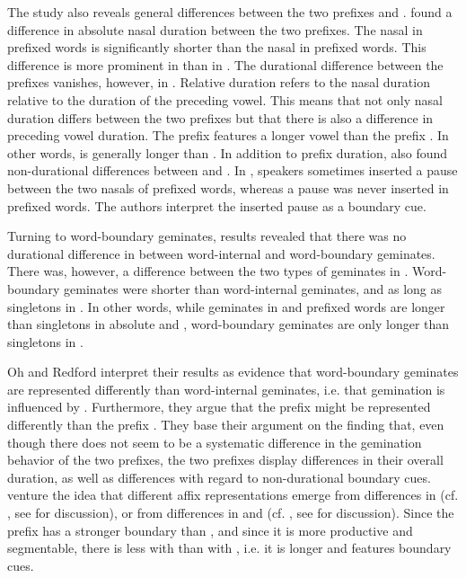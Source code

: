 The study also reveals general differences between the two prefixes  and . \cite{Oh.2012} found a difference in absolute nasal duration between the two prefixes. The nasal in prefixed words is significantly shorter than the nasal in prefixed words. This difference is more prominent in  than in . The durational difference between the prefixes vanishes, however, in . Relative duration refers to the nasal duration relative to the duration of the preceding vowel. This means that not only nasal duration differs between the two prefixes but that there is also a difference in preceding vowel duration. The prefix  features a longer vowel than the prefix .  In other words,  is generally longer than . In addition to prefix duration, \cite{Oh.2012} also found non-durational differences between  and . In , speakers sometimes inserted a pause between the two nasals of prefixed words, whereas a pause was never inserted in prefixed words. The authors interpret the inserted pause as a boundary cue.

Turning to word-boundary geminates,  results revealed that there was no durational difference in  between word-internal and word-boundary geminates. There was, however, a difference between the two types of geminates in . Word-boundary geminates were shorter than word-internal geminates, and as long as singletons in . In other words, while geminates in  and prefixed words are longer than singletons in absolute and , word-boundary geminates are only longer than singletons in .


Oh and Redford interpret their results as evidence that word-boundary geminates are represented differently than word-internal geminates, i.e. that gemination is influenced by .  Furthermore, they argue that the prefix  might be represented differently than the prefix . They base their argument on the finding that, even though there does not seem to be a systematic difference in the gemination behavior of the two prefixes, the two prefixes display differences in their overall duration, as well as differences with regard to non-durational boundary cues. \cite{Oh.2012} venture the idea that different affix representations emerge from differences in  (cf. \citealt{Kiparsky.1982,Mohanan.1986}, see  for discussion), or from differences in  and  (cf. \citealt{Hay.2003}, see  for discussion). Since the prefix  has a stronger boundary than , and since it is more productive and segmentable, there is less  with  than with , i.e. it is longer and features boundary cues.


